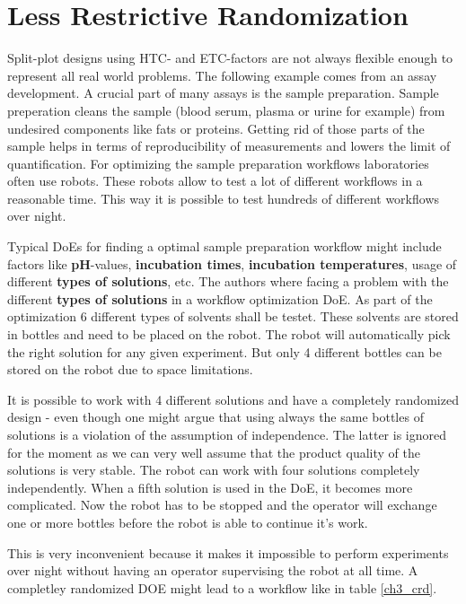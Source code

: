 \section{Less Restrictive Randomization}\label{semisplitplots}

Split-plot designs using HTC- and ETC-factors are not always flexible enough to represent all real world problems. The following example comes from an assay development. A crucial part of many assays is the sample preparation. Sample preperation cleans the sample (blood serum, plasma or urine for example) from undesired components like fats or proteins. Getting rid of those parts of the sample helps in terms of reproducibility of measurements and lowers the limit of quantification. For optimizing the sample preparation workflows laboratories often use robots. These robots allow to test a lot of different workflows in a reasonable time. This way it is possible to test hundreds of different workflows over night. 

Typical DoEs for finding a optimal sample preparation workflow might include factors like \textbf{pH}-values, \textbf{incubation times}, \textbf{incubation temperatures}, usage of different \textbf{types of solutions}, etc. The authors where facing a problem with the different \textbf{types of solutions} in a workflow optimization DoE. As part of the optimization 6 different types of solvents shall be testet. These solvents are stored in bottles and need to be placed on the robot. The robot will automatically pick the right solution for any given experiment. But only 4 different bottles can be stored on the robot due to space limitations.

It is possible to work with 4 different solutions and have a completely randomized design - even though one might argue that using always the same bottles of solutions is a violation of the assumption of independence. The latter is ignored for the moment as we can very well assume that the product quality of the solutions is very stable. The robot can work with four solutions completely independently. When a fifth solution is used in the DoE, it becomes more complicated. Now the robot has to be stopped and the operator will exchange one or more bottles before the robot is able to continue it's work. 

This is very inconvenient because it makes it impossible to perform experiments over night without having an operator supervising the robot at all time. A completley randomized DOE might lead to a workflow like in table \ref{ch3_crd}.

